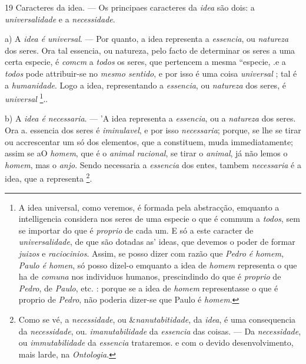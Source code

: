 19 Caracteres da idea. --- Os principaes caracteres da \emph{idea} são dois: a \emph{universalidade} e a \emph{necessidade}.

a) A \emph{idea é universal}. --- Por quanto, a idea representa a \emph{essencia}, ou \emph{natureza} dos seres. Ora tal essencia, ou natureza, pelo facto de determinar os seres a uma certa especie, é \emph{comcm} a \emph{todos} os seres, que pertencem a mesma “especie, .e a \emph{todos} pode attribuir-se no \emph{mesmo sentido}, e por isso é uma coisa \emph{universal} ; tal é a \emph{humanidade}. Logo a idea, representando a \emph{essencia}, ou \emph{natureza} dos seres, é \emph{universal} \footnote{A idea universal, como veremos, é formada pela abstracção, emquanto a intelligencia considera nos seres de uma especie o que é commum a \emph{todos}, sem se importar do que é \emph{proprio} de cada um. E só a este caracter de \emph{universalidade}, de que são dotadas as' ideas, que devemos o poder de formar \emph{juizos} e \emph{raciocinios}. Assim, se posso dizer com razão que \emph{Pedro é homem}, \emph{Paulo é homen}, só posso dizel-o emquanto a idea de \emph{homem} representa o que ha de \emph{comuna} nos individuos humanos, prescindindo do que é \emph{proprio} de \emph{Pedro}, de \emph{Paulo}, etc. : porque se a idea de \emph{homem} representasse o que é proprio de \emph{Pedro}, não poderia dizer-se que Paulo é \emph{homem}.}..

b) A \emph{idea é necessaria}. --- 'A idea representa a \emph{essencia}, ou a \emph{natureza} dos seres. Ora a. essencia dos seres é \emph{iminulavel}, e por isso \emph{necessaria}; porque, se lhe se tirar ou accrescentar um só dos elementos, que a constituem, muda immediatamente; assim se aO \emph{homem}, que é o \emph{animal racional}, se tirar o \emph{animal}, já não lemos o \emph{homem}, mas o \emph{anjo}. Sendo necessaria a \emph{essencia} dos entes, tambem \emph{necessaria} é a idea, que a representa \footnote{Como se vé, a \emph{necessidade}, ou \&\emph{nanutabitidade}, da \emph{idea}, é uma consequencia da \emph{necessidade}, ou. \emph{imanutabilidade} da \emph{essencia} das coisas. --- Da \emph{necessidade}, ou \emph{immutabilidade} da \emph{essencia} trataremos. e com o devido desenvolvimento, mais larde, na \emph{Ontologia}.}.


